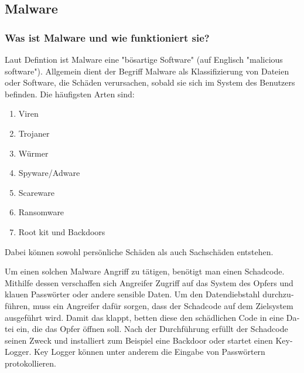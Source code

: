 \begin{otherlanguage}{ngerman}
\subsection{Malware}
\subsubsection{Was ist Malware und wie funktioniert sie?}

Laut Defintion ist Malware eine "bösartige Software"
(auf Englisch "malicious software").
\newline Allgemein dient der Begriff Malware als Klassifizierung von Dateien oder Software, die Schäden verursachen, sobald sie sich im System des Benutzers befinden. 
\newline Die häufigsten Arten sind:
\begin{enumerate}
    \item Viren
    \item Trojaner
    \item Würmer
    \item Spyware/Adware
    \item Scareware
    \item Ransomware
    \item Root kit und Backdoors
\end{enumerate}
Dabei können sowohl persönliche Schäden als auch Sachschäden entstehen.

Um einen solchen Malware Angriff zu tätigen, benötigt man einen Schadcode. 
Mithilfe dessen verschaffen sich Angreifer Zugriff auf das System des Opfers und klauen Passwörter oder andere sensible Daten.
Um den Datendiebstahl durchzuführen, muss ein Angreifer dafür sorgen, dass der Schadcode auf dem Zielsystem ausgeführt wird. 
Damit das klappt, betten diese den schädlichen Code in eine Datei ein, die das Opfer öffnen soll.
Nach der Durchführung erfüllt der Schadcode seinen Zweck und installiert zum Beispiel eine Backdoor oder startet einen Key-Logger. Key Logger können unter anderem die Eingabe von Passwörtern protokollieren.


\end{otherlanguage}
